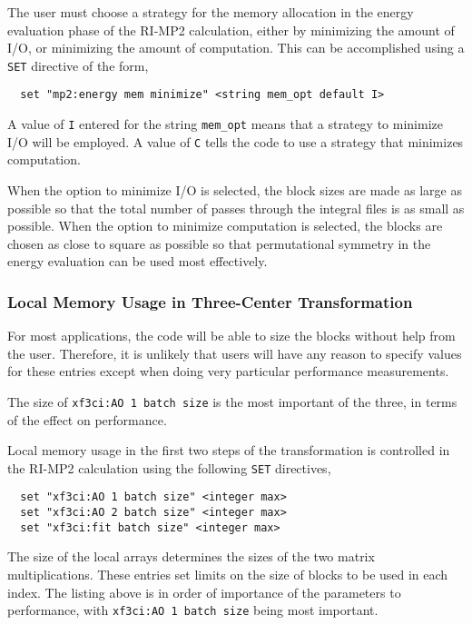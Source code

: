 The user must choose a  strategy for the memory allocation in the energy
evaluation phase of the RI-MP2 calculation, either by minimizing the amount
of I/O, or minimizing the amount of computation.  This can be accomplished 
using a \verb+SET+ directive of the form,

\begin{verbatim}
  set "mp2:energy mem minimize" <string mem_opt default I>
\end{verbatim}

A value of \verb+I+ entered for the string \verb+mem_opt+ means that a
strategy to minimize I/O will be employed.  A value of \verb+C+ tells
the code to use a strategy that minimizes computation.

When the option to minimize I/O is selected, the block sizes are made
as large as possible so that the total number of passes through the
integral files is as small as possible.  When the option to minimize
computation is selected, the blocks are chosen as close to square as
possible so that permutational symmetry in the energy evaluation can
be used most effectively.


\subsubsection{Local Memory Usage in Three-Center Transformation}

For most applications, the code will be able to size the blocks
without help from the user.  Therefore, it is unlikely that users will
have any reason to specify values for these entries except when doing
very particular performance measurements.

The size of \verb+xf3ci:AO 1 batch size+ is the most important of the
three, in terms of the effect on performance.

Local memory usage in the first two steps of the transformation is
controlled in the RI-MP2 calculation using the following \verb+SET+
directives,

\begin{verbatim}
  set "xf3ci:AO 1 batch size" <integer max>
  set "xf3ci:AO 2 batch size" <integer max>
  set "xf3ci:fit batch size" <integer max>
\end{verbatim}

The size of the local arrays determines the sizes of the two matrix
multiplications.  These entries set limits on the size of blocks to be
used in each index.  The listing above is in order of importance of
the parameters to performance, with \verb+xf3ci:AO 1 batch size+ being
most important.

